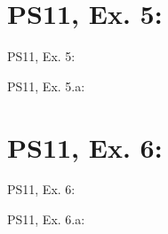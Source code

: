 \section{PS11, Ex. 5: }

\begin{frame}{PS11, Ex. 5: }
    \begin{multicols}{2}
      \vfill\null\columnbreak
      \vfill
    \end{multicols}
\end{frame}

\begin{frame}{PS11, Ex. 5.a: }
    \begin{multicols}{2}
      \vfill\null\columnbreak
      \vfill\null
    \end{multicols}
\end{frame}



\section{PS11, Ex. 6: }

\begin{frame}{PS11, Ex. 6: }
    \begin{multicols}{2}
      \vfill\null\columnbreak
      \vfill\null
    \end{multicols}
\end{frame}

\begin{frame}{PS11, Ex. 6.a: }
    \begin{multicols}{2}
      \vfill\null\columnbreak
      \vfill\null
    \end{multicols}
\end{frame}
